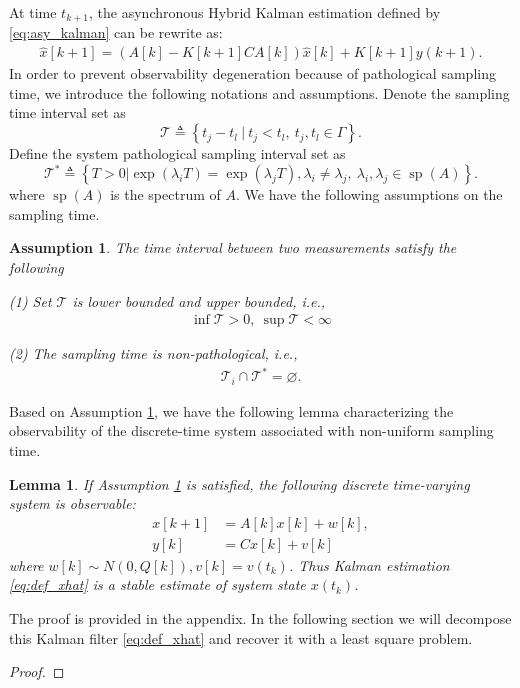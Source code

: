 \documentclass[12pt]{article}
\newcommand{\Tc}{{\mathcal{T}}}
\newcommand{\ift}{{\infty}}
\DeclareMathOperator{\spe}{sp}
\newtheorem{lemma}{\textbf{Lemma}}
\newtheorem{assumption}{\textbf{Assumption}}
\newtheorem*{proof}{\textbf{Proof}}
\begin{document}
At time $t_{k+1}$, the asynchronous Hybrid Kalman estimation defined by \eqref{eq:asy_kalman} can be rewrite as:
\begin{align}\label{eq:def_xhat}
\hat{x}[k+1] =\left( A[k]-K[k+1]C A[k] \right) \hat{x}[k] + K[k+1] y({k+1}) .
\end{align}
In order to prevent observability degeneration because of pathological sampling time, we introduce the following notations and assumptions.
Denote the sampling time interval set as 
\begin{equation*}
\Tc\triangleq \left\{t_{j}-t_{l}\ | \ t_j<t_l,\ t_j,t_l\in\Gamma \right\} .
\end{equation*}
Define the system pathological sampling interval set as 
\begin{equation*}
\Tc^*\triangleq \left\{ T>0 | \exp(\lambda_i T)=\exp(\lambda_j T),  \lambda_i\neq\lambda_j,\ \lambda_i,\lambda_j\in \spe(A) \right\} .
\end{equation*}
where $\spe(A)$ is the spectrum of $A$.  %
We have the following assumptions on the sampling time.
\begin{assumption}\label{as:sample_time} %
	The time interval between two measurements satisfy the following 
	
	(1) Set $\Tc$ is lower bounded and upper bounded, i.e.,
	\begin{align*}
	\inf \Tc > 0,\ \sup \Tc <\ift
	\end{align*}
	
	(2) The sampling time is non-pathological, i.e.,
	\begin{align}
	\Tc_i\cap \Tc^*=\varnothing .
	\end{align}
\end{assumption} 
Based on Assumption \ref{as:sample_time}, we have the following lemma characterizing the observability of the discrete-time system associated with non-uniform sampling time. 
\begin{lemma}
	If Assumption \ref{as:sample_time} is satisfied, the following discrete time-varying system is observable:
	\begin{align*}
	x[k+1]&=A[k]x[k]+w[k],\\
	 y[k]&=Cx[k]+v[k]
	\end{align*}
	where $w[k]\sim N(0,Q[k]), v[k]=v(t_k)$. Thus Kalman estimation \eqref{eq:def_xhat} is a stable estimate of system state $x(t_k)$.
\end{lemma}
The proof is provided in the appendix.
In the following section we will decompose this Kalman filter \eqref{eq:def_xhat} and recover it with a least square problem.
\begin{proof}
	\end{proof}
\end{document}
